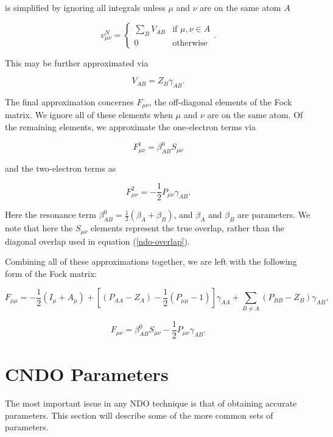 \noindent is simplified by ignoring all integrals unless $\mu$ and
$\nu$ are on the same atom $A$

\begin{equation}
	v^N_{\mu\nu} = \left\{
		\begin{array}{ll}
		\sum_B V_{AB}  & \mbox{if $\mu,\nu \in A$} \\
		0 & \mbox{otherwise}
		\end{array}
		\right. .
\end{equation}

\noindent This may be further approximated via

\begin{equation}
	V_{AB} = Z_B\gamma_{AB}.
\end{equation}

The final approximation concernes $F_{\mu\nu}$, the off-diagonal
elements of the Fock matrix. We ignore all of these elements when
$\mu$ and $\nu$ are on the same atom. Of the remaining elements, we
approximate the one-electron terms via

\begin{equation}
	F_{\mu\nu}^1 = \beta_{AB}^0S_{\mu\nu}
\end{equation}

\noindent and the two-electron terms as

\begin{equation}
	F_{\mu\nu}^2 = -\frac{1}{2}P_{\mu\nu}\gamma_{AB}.
\end{equation}

\noindent Here the resonance term $\beta_{AB}^0 = \frac{1}{2}(\beta_A
+ \beta_B)$, and $\beta_A$ and $\beta_B$ are parameters. We note that
here the $S_{\mu\nu}$ elements represent the true overlap, rather than
the diagonal overlap used in equation (\ref{ndo-overlap}).

Combining all of these approximations together, we are left with the
following form of the Fock matrix:

\begin{equation}
	F_{\mu\mu} = -\frac{1}{2}(I_\mu + A_\mu)
		+ [(P_{AA}-Z_A) - \frac{1}{2}(P_{\mu\mu}-1)]\gamma_{AA}
		+ \sum_{B \neq A} (P_{BB}-Z_B)\gamma_{AB},
\end{equation}

\begin{equation}
	F_{\mu\nu} = \beta_{AB}^0S_{\mu\nu} 
		- \frac{1}{2}P_{\mu\nu}\gamma_{AB}.
\end{equation}

\section{CNDO Parameters}
The most important issue in any NDO technique is that of obtaining
accurate parameters. This section will describe some of the more
common sets of parameters.


